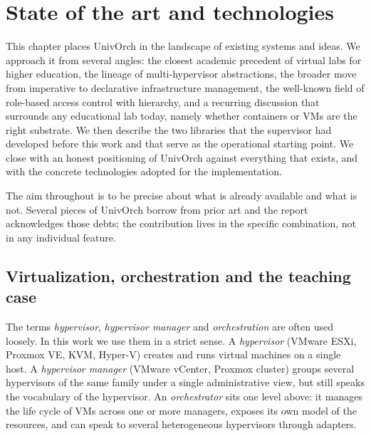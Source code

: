 
\chapter{State of the art and technologies}
\label{ch:estado-arte}

This chapter places UnivOrch in the landscape of existing systems
and ideas. We approach it from several angles: the closest academic
precedent of virtual labs for higher education, the lineage of
multi-hypervisor abstractions, the broader move from imperative to
declarative infrastructure management, the well-known field of
role-based access control with hierarchy, and a recurring discussion
that surrounds any educational lab today, namely whether containers
or VMs are the right substrate. We then describe the two libraries
that the supervisor had developed before this work and that serve as
the operational starting point. We close with an honest positioning
of UnivOrch against everything that exists, and with the concrete
technologies adopted for the implementation.

The aim throughout is to be precise about what is already available
and what is not. Several pieces of UnivOrch borrow from prior art and
the report acknowledges those debts; the contribution lives in the
specific combination, not in any individual feature.

\section{Virtualization, orchestration and the teaching case}
\label{sec:virtualizacion-orquestacion}

The terms \emph{hypervisor}, \emph{hypervisor manager} and
\emph{orchestration} are often used loosely. In this work we use them
in a strict sense. A \emph{hypervisor} (VMware ESXi, Proxmox VE,
KVM, Hyper-V) creates and runs virtual machines on a single host. A
\emph{hypervisor manager} (VMware vCenter, Proxmox cluster) groups
several hypervisors of the same family under a single administrative
view, but still speaks the vocabulary of the hypervisor. An
\emph{orchestrator} sits one level above: it manages the life cycle
of VMs across one or more managers, exposes its own model of the
resources, and can speak to several heterogeneous hypervisors through
adapters.


